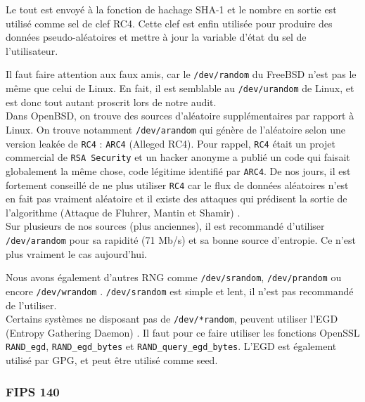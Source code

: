 			Le tout est envoyé à la fonction de hachage SHA-1 et le nombre en sortie est utilisé comme sel de clef RC4. Cette clef est enfin utilisée pour produire des données pseudo-aléatoires et mettre à jour la variable d'état du sel de l'utilisateur. 
			
			
			Il faut faire attention aux faux amis, car le \texttt{/dev/random} du FreeBSD n'est pas le même que celui de Linux. En fait, il est semblable au \texttt{/dev/urandom} de Linux, et est donc tout autant proscrit lors de notre audit.\\ 

			Dans OpenBSD, on trouve des sources d'aléatoire supplémentaires par rapport à Linux. On trouve notamment \texttt{/dev/arandom} qui génère de l'aléatoire selon une version leakée de \texttt{RC4} : \texttt{ARC4} (Alleged RC4). Pour rappel, \texttt{RC4} était un projet commercial de \texttt{RSA Security} et un hacker anonyme a publié un code qui faisait globalement la même chose, code légitime identifié par \texttt{ARC4}. De nos jours, il est fortement conseillé de ne plus utiliser \texttt{RC4} car le flux de données aléatoires n'est en fait pas vraiment aléatoire et il existe des attaques qui prédisent la sortie de l'algorithme (Attaque de Fluhrer, Mantin et Shamir) \nocite{Fluhrer01weaknessesin}.	\\
			
			
			Sur plusieurs de nos sources (plus anciennes), il est recommandé d'utiliser \texttt{/dev/arandom} pour sa rapidité (71 Mb/s) et sa bonne source d'entropie. Ce n'est plus vraiment le cas aujourd'hui.\\

	
		
			Nous avons également d'autres RNG comme \texttt{/dev/srandom}, \texttt{/dev/prandom} ou encore \texttt{/dev/wrandom} \cite{miros2013}. \texttt{/dev/srandom} est simple et lent, il n'est pas recommandé de l'utiliser.\\

			Certains systèmes ne disposant pas de \texttt{/dev/*random}, peuvent utiliser l'EGD (Entropy Gathering Daemon) \cite{egdsf.net}. Il faut pour ce faire utiliser les fonctions OpenSSL \texttt{RAND\_egd}, \texttt{RAND\_egd\_bytes} et \texttt{RAND\_query\_egd\_bytes}. L'EGD est également utilisé par GPG, et peut être utilisé comme seed.
			
	\subsubsection{FIPS 140}
	

